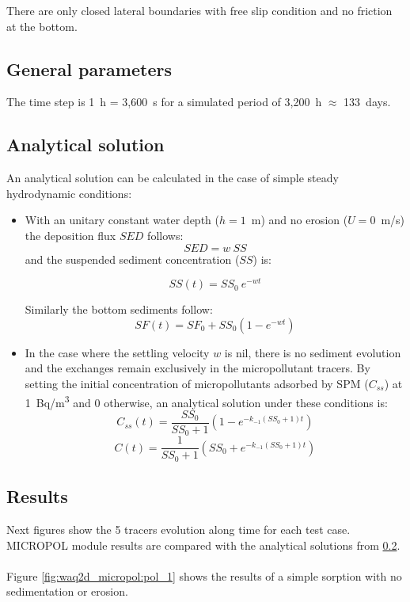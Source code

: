 There are only closed lateral boundaries with free slip condition
and no
friction at the bottom.

\subsection{General parameters}

The time step is 1~h = 3,600~s for a simulated period of 3,200~h $\approx$ 133~days.

\subsection{Analytical solution}
\label{Analytical}
An analytical solution can be calculated in the case of simple steady hydrodynamic conditions:
\begin{itemize}
\item With an unitary constant water depth ($h=1$~m) and no erosion ($U=0$~m/s) the deposition flux $SED$ follows:
  $$SED = w~SS$$
  and the suspended sediment concentration ($SS$) is:

  $$ SS(t) = SS_0~e^{-wt}$$

  Similarly the bottom sediments follow:
  $$SF(t)=SF_{0} +SS_0(1-e^{-wt})$$
\item In the case where the settling velocity $w$ is nil, there is no
  sediment evolution and the exchanges remain exclusively in the
  micropollutant tracers. By setting the initial concentration of
  micropollutants adsorbed by SPM ($C_{ss}$) at 1~Bq/m\textsuperscript{3}
  and 0 otherwise, an analytical solution under these conditions is:
  $$ C_{ss}(t)=\frac{SS_0}{SS_0+1}(1-e^{-k_{-1}(SS_0+1)t})$$
  $$ C(t)=\frac{1}{SS_0+1}(SS_0+e^{-k_{-1}(SS_0+1)t})$$
\end{itemize}


\subsection{Results}

Next figures show the 5 tracers evolution along time for each test case.
MICROPOL module results are compared with the analytical solutions from
\ref{Analytical}.

\paragraph{}
Figure \ref{fig:waq2d_micropol:pol_1} shows the results of a simple sorption
with no sedimentation or erosion.

